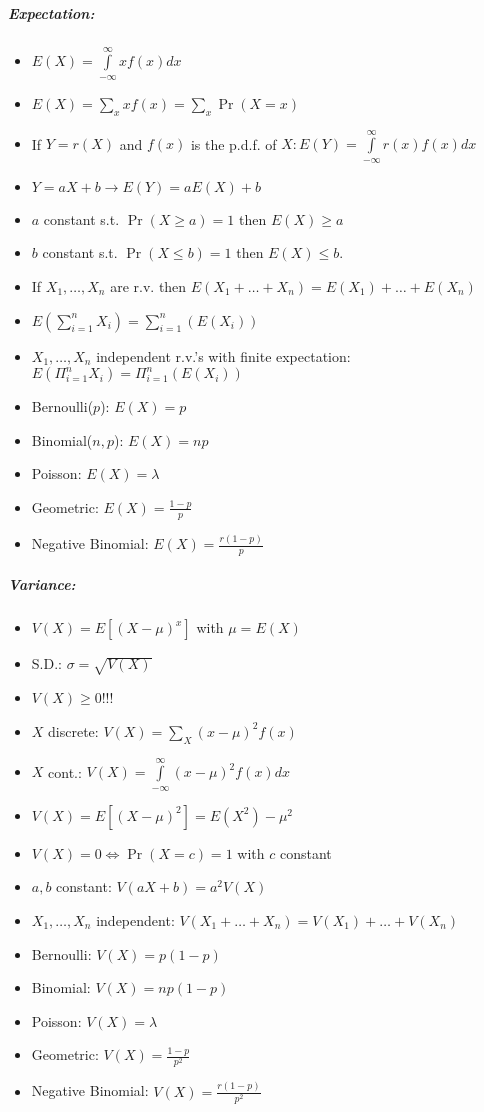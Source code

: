\documentclass[landscape,10pt]{article}
\begin{document}
\begin{multicols}{4}
\subparagraph*{Expectation: }
\begin{itemize}
    \item[] \( E(X) = \int\limits_{-\infty}^{\infty}{x f(x)dx}\)
    \item[] \( E(X) = \sum\limits_{x}xf(x) = \sum\limits_{x}\Pr(X=x)\)
    \item[] If \(Y = r(X)\) and \(f(x)\) is the p.d.f. of \(X: E(Y) = \int\limits_{-\infty}^{\infty}{r(x)f(x)dx}\)
    \item[] \(Y = aX + b \rightarrow E(Y) = aE(X)+b\)
    \item[] \(a\) constant s.t. \(\Pr(X \geq a) = 1\) then \(E(X) \geq a\)
    \item[] \(b\) constant s.t. \(\Pr(X \leq b) = 1\) then \(E(X) \leq b\).
    \item[] If \(X_1, \ldots, X_n \) are r.v. then \(E(X_1+\ldots+X_n) = E(X_1) + \ldots +E(X_n)\)
    \item[] \(E\left( \sum_{i = 1}^{n}X_i \right) = \sum_{i = 1}^{n}(E(X_i))\)
    \item[] \(X_1, \ldots, X_n\) independent r.v.'s with finite expectation: \(E\left(\Pi_{i=1}^{n}{X_i} \right) = \Pi_{i=1}^{n}\left(E(X_i)\right)\)
    \item[] Bernoulli(\(p\)): \(E(X) = p\)
    \item[] Binomial(\(n,p\)): \(E(X) = np\)
    \item[] Poisson: \(E(X) = \lambda\)
    \item[] Geometric: \(E(X) = \frac{1-p}{p}\)
    \item[] Negative Binomial: \(E(X) = \frac{r(1-p)}{p}\)
\end{itemize}

\subparagraph*{Variance: }
\begin{itemize}
    \item[] \(V(X) = E[(X-\mu)^x]\) with \(\mu = E(X)\)
    \item[] S.D.: \(\sigma = \sqrt{V(X)}\)
    \item[] \(V(X) \geq 0\)!!!
    \item[] \(X\) discrete: \(V(X) = \sum\limits_X{(x-\mu)^2f(x)}\)
    \item[] \(X\) cont.: \(V(X) = \int\limits_{-\infty}^{\infty}{(x-\mu)^2f(x)dx}\)
    \item[] \(V(X) = E[(X-\mu)^2] = E(X^2) - \mu^2\)
    \item[] \(V(X) = 0 \iff \Pr(X = c) = 1\) with \(c\) constant
    \item[] \(a, b\) constant: \(V(aX+b) = a^2V(X)\)
    \item[] \(X_1,\ldots,X_n\) independent: \(V(X_1+\ldots+X_n) = V(X_1)+ \ldots + V(X_n)\)
    \item[] Bernoulli: \(V(X) = p(1-p)\)
    \item[] Binomial: \(V(X) = np(1-p)\)
    \item[] Poisson: \(V(X) = \lambda\)
    \item[] Geometric: \(V(X) = \frac{1-p}{p^2}\)
    \item[] Negative Binomial: \(V(X) = \frac{r(1-p)}{p^2}\)
\end{itemize}


\end{multicols}
\end{document}
